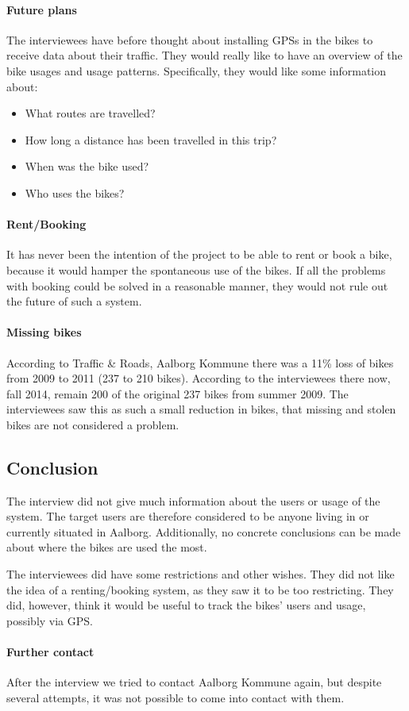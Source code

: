 \paragraph{Future plans}
The interviewees have before thought about installing GPSs in the bikes to receive data about their traffic.
They would really like to have an overview of the bike usages and usage patterns.
Specifically, they would like some information about:
\begin{itemize}
\item What routes are travelled?
\item How long a distance has been travelled in this trip?
\item When was the bike used?
\item Who uses the bikes?
\end{itemize}

\paragraph{Rent/Booking}
It has never been the intention of the project to be able to rent or book a bike, because it would hamper the spontaneous use of the bikes.
If all the problems with booking could be solved in a reasonable manner, they would not rule out the future of such a system.

\paragraph{Missing bikes}
According to Traffic \& Roads, Aalborg Kommune\cite{cykelplanlaegning} there was a 11\% loss of bikes from 2009 to 2011 (237 to 210 bikes).
According to the interviewees there now, fall 2014, remain 200 of the original 237 bikes from summer 2009.
The interviewees saw this as such a small reduction in bikes, that missing and stolen bikes are not considered a problem.

\subsection{Conclusion}
The interview did not give much information about the users or usage of the system.
The target users are therefore considered to be anyone living in or currently situated in Aalborg.
Additionally, no concrete conclusions can be made about where the bikes are used the most.

The interviewees did have some restrictions and other wishes.
They did not like the idea of a renting/booking system, as they saw it to be too restricting.
They did, however, think it would be useful to track the bikes' users and usage, possibly via GPS.

\paragraph{Further contact}
After the interview we tried to contact Aalborg Kommune again, but despite several attempts, it was not possible to come into contact with them.
